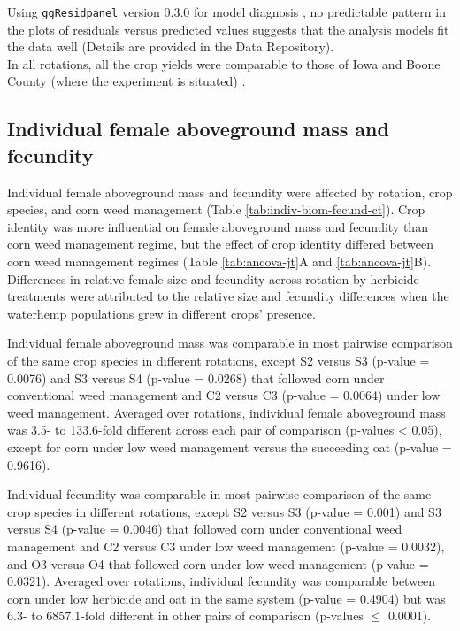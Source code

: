 \documentclass[
]{article}
\begin{document}
Using \texttt{ggResidpanel} version 0.3.0 for model diagnosis \citep{goodeGgResidpanelPanelsInteractive2019}, no predictable pattern in the plots of residuals versus predicted values suggests that the analysis models fit the data well (Details are provided in the Data Repository).\\
In all rotations, all the crop yields were comparable to those of Iowa and Boone County (where the experiment is situated) \citep{nguyenWeedCommunityCompositioninpreparation}.

\hypertarget{individual-female-aboveground-mass-and-fecundity-2}{%
\subsection*{Individual female aboveground mass and fecundity}\label{individual-female-aboveground-mass-and-fecundity-2}}

Individual female aboveground mass and fecundity were affected by rotation, crop species, and corn weed management (Table \ref{tab:indiv-biom-fecund-ct}). Crop identity was more influential on female aboveground mass and fecundity than corn weed management regime, but the effect of crop identity differed between corn weed management regimes (Table \ref{tab:ancova-jt}A and \ref{tab:ancova-jt}B). Differences in relative female size and fecundity across rotation by herbicide treatments were attributed to the relative size and fecundity differences when the waterhemp populations grew in different crops' presence.

Individual female aboveground mass was comparable in most pairwise comparison of the same crop species in different rotations, except S2 versus S3 (p-value = 0.0076) and S3 versus S4 (p-value = 0.0268) that followed corn under conventional weed management and C2 versus C3 (p-value = 0.0064) under low weed management. Averaged over rotations, individual female aboveground mass was 3.5- to 133.6-fold different across each pair of comparison (p-values \textless{} 0.05), except for corn under low weed management versus the succeeding oat (p-value = 0.9616).

Individual fecundity was comparable in most pairwise comparison of the same crop species in different rotations, except S2 versus S3 (p-value = 0.001) and S3 versus S4 (p-value = 0.0046) that followed corn under conventional weed management and C2 versus C3 under low weed management (p-value = 0.0032), and O3 versus O4 that followed corn under low weed management (p-value = 0.0321). Averaged over rotations, individual fecundity was comparable between corn under low herbicide and oat in the same system (p-value = 0.4904) but was 6.3- to 6857.1-fold different in other pairs of comparison (p-values \(\leq\) 0.0001).
\end{document}
